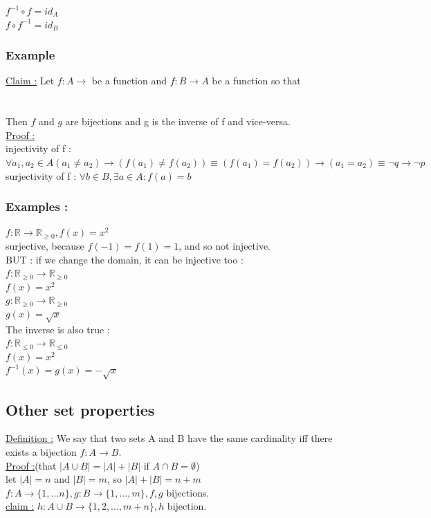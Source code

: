 \documentclass[12pt,a4paper]{article}
\begin{document}
\begin{boite}[0.2]
$f^{-1} \circ f = id_A$\\
$f \circ f^{-1} = id_B$
\end{boite}

\subsubsection{Example}
\underline{Claim :} Let $f : A \rightarrow $ be a function and $f : B \rightarrow A$ be a function so that\\
\\
\\
Then $f$ and $g$ are bijections and g is the inverse of f and vice-versa.\\
\underline{Proof :}\\
{injectivity of f :} $\forall a_1, a_2 \in A (a_1 \neq a_2) \rightarrow (f(a_1) \neq f(a_2)) \equiv (f(a_1) = f(a_2)) \rightarrow (a_1 = a_2) \equiv \neg q \rightarrow \neg p$\\
{surjectivity of f :} $\forall b\in B, \exists a \in A :f(a) = b$
\subsubsection{Examples :}
$f :\mathbb{R} \rightarrow \mathbb{R}_{\geq 0}, f(x) = x^2$\\
surjective, because $f(-1) = f(1) = 1$, and so not injective.\\
BUT : if we change the domain, it can be injective too :\\ $f : \mathbb{R}_{\geq 0} \rightarrow \mathbb{R}_{\geq 0}$\\
$f(x) = x^2$\\
$g : \mathbb{R}_{\geq 0} \rightarrow \mathbb{R}_{\geq 0}$\\
$g(x) = \sqrt{x}$\\
The inverse is also true : \\
$f : \mathbb{R}_{\leq 0} \rightarrow \mathbb{R}_{\leq 0}$\\
$f(x) = x^2$\\
$f^{-1}(x) = g(x) = -\sqrt{x}$\\
\subsection{Other set properties}
\underline{Definition :} We say that two sets A and B have the same cardinality iff there exists a bijection $f: A \rightarrow B$.\\
\underline{Proof :}(that $|A \cup B| = |A| + |B|$ if $A \cap B = \emptyset$)\\
let $|A| = n$ and $|B| = m$, so $|A| + |B| = n + m$\\
$f: A \rightarrow \{1,...n\}, g : B \rightarrow \{1,...,m\}, f,g$ bijections.\\
\underline{claim :} $h : A \cup B \rightarrow \{1,2,...,m+n\}, h$ bijection.\\
\end{document}
